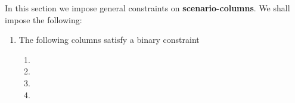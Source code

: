 \begin{center}
\end{center}
In this section we impose general constraints on \textbf{scenario-columns}. We shall impose the following:
\begin{enumerate}
	\item The following columns satisfy a binary constraint \lispDone{}
		\begin{enumerate}
			\item \scenSelfdestructException{}
			\item \scenSelfdestructWillRevert{}
			\item \scenSelfdestructWontRevertAlreadyMarked{}
			\item \scenSelfdestructWontRevertNotYetMarked{}
		\end{enumerate}
\end{enumerate}
